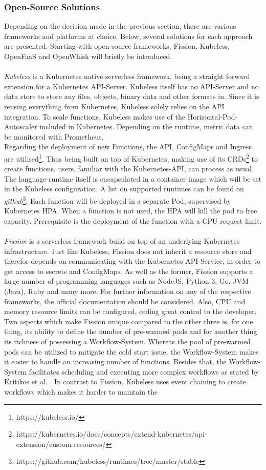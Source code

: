 \documentclass[a4paper,twoside,11pt, pagesize]{scrartcl}
\begin{document}
\begin{spacing}{1.2}
\subsubsection{Open-Source Solutions}
Depending on the decision made in the previous section, there are various frameworks and platforms at choice. Below, several solutions for each approach are presented. Starting with open-source frameworks, Fission, Kubeless, OpenFaaS and OpenWhisk will briefly be introduced.\\\\ \textit{Kubeless} is a Kubernetes native serverless framework, being a straight forward extension for a Kubernetes API-Server. Kubeless itself has no API-Server and no data store to store any files, objects, binary data and other formats in. Since it is reusing everything from Kubernetes, Kubeless solely relies on the API integration. To scale functions, Kubeless makes use of the Horizontal-Pod-Autoscaler included in Kubernetes. Depending on the runtime, metric data can be monitored with Prometheus.\\Regarding the deployment of new Functions, the API, ConfigMaps and Ingress are utilised\footnote{https://kubeless.io/}. Thus being built on top of Kubernetes, making use of its CRDs\footnote{https://kubernetes.io/docs/concepts/extend-kubernetes/api-extension/custom-resources/} to create functions, users, familiar with the Kubernetes-API, can process as usual. The language-runtime itself is encapsulated in a container image which will be set in the Kubeless configuration. A list on supported runtimes can be found on \textit{github}\footnote{https://github.com/kubeless/runtimes/tree/master/stable}. Each function will be deployed in a separate Pod, supervised by Kubernetes HPA. When a function is not used, the HPA will kill the pod to free capacity. Prerequisite is the deployment of the function with a CPU request limit.\\\\ \textit{Fission} is a serverless framework build on top of an underlying Kubernetes infrastructure. Just like Kubeless, Fission does not inherit a resource store and therefor depends on communicating with the Kubernetes API-Service, in order to get access to secrets and ConfigMaps. As well as the former, Fission supports a large number of programming languages such as NodeJS, Python 3, Go, JVM (Java), Ruby and many more. For further information on any of the respective frameworks, the official documentation should be considered. Also, CPU and memory resource limits can be configured, ceding great control to the developer. Two aspects which make Fission unique compared to the other three is, for one thing, its ability to define the number of pre-warmed pods and for another thing its richness of possessing a Workflow-System. Whereas the pool of pre-warmed pods can be utilized to mitigate the cold start issue, the Workflow-System makes it easier to handle an increasing number of functions. Besides that, the Workflow-System facilitates scheduling and executing more complex workflows as stated by Kritikos et al. \cite{kritikos2018review}. In contrast to Fission, Kubeless uses event chaining to create workflows which makes it harder to maintain the 
\end{spacing}
\end{document}

